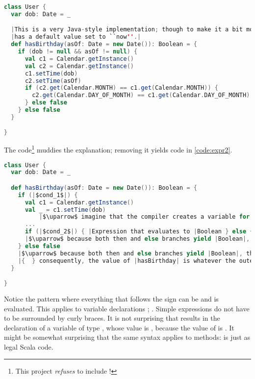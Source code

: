 \documentclass[10 pt]{article}
\begin{document}
\begin{lstlisting}[caption={Expressions}, label={code:expr}, language=Scala, escapechar=|]
class User {
  var dob: Date = _

  |This is a very Java-style implementation; though to make it a bit more interesting, the |asOf| parameter|
  |has a default value set to ``now''.|
  def hasBirthday(asOf: Date = new Date()): Boolean = {
    if (dob != null && asOf != null) {
      val c1 = Calendar.getInstance()
      val c2 = Calendar.getInstance()
      c1.setTime(dob)
      c2.setTime(asOf)
      if (c2.get(Calendar.MONTH) == c1.get(Calendar.MONTH)) {
        c2.get(Calendar.DAY_OF_MONTH) == c1.get(Calendar.DAY_OF_MONTH)
      } else false
    } else false
  }

}
\end{lstlisting}

The  code\footnote{This project \emph{refuses} to include !} muddies the explanation; removing it yields code in \autoref{code:expr2}.

\begin{lstlisting}[caption={Expressions}, label={code:expr2}, language=Scala, escapechar=|]
class User {
  var dob: Date = _

  def hasBirthday(asOf: Date = new Date()): Boolean = {
    if (|$cond_1$|) {
      val c1 = Calendar.getInstance()
      val _ = c1.setTime(dob)
          |$\uparrow$ imagine that the compiler creates a variable for every expression that isn't the last one in a block.|
      ...
      if (|$cond_2$|) { |Expression that evaluates to |Boolean } else { |Expression that evaluates to |Boolean }
      |$\uparrow$ because both then and else branches yield |Boolean|, the value of the entire |if| expression is |Boolean|.|
    } else false
    |$\uparrow$ because both then and else branches yield |Boolean|, the value of the entire |if| expression is |Boolean|.|
    |{  } consequently, the value of |hasBirthday| is whatever the outer |if| expression evaluates to.|
  }

}
\end{lstlisting}

Notice the pattern where everything that follows the \pcode{=} sign can be and is evaluated. This applies to variable declarations ; . Simple expressions do not have to be surrounded by curly braces. It is not surprising that  results in the declaration of a variable  of type , whose value is , because the value of  is . It might be somewhat surprising that the same syntax applies to methods:  is just as legal Scala code.
\end{document}

